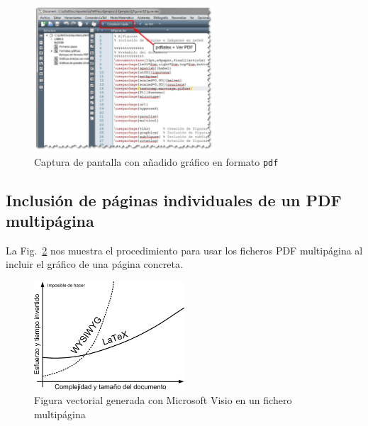 \documentclass[11pt,a4paper]{article}
\begin{document}
\begin{figure}[H]
	\centering
	\includegraphics[width=0.6\textwidth]{../figs/texmk03} 
	\caption[Captura con gráfico en \texttt{pdf}]{Captura de pantalla con añadido gráfico en formato \texttt{pdf}}
	\label{fig:texmk03}
\end{figure}











\subsection{Inclusión de páginas individuales de un \textsf{PDF} multipágina}
La Fig.~\ref{fig:visio_mp} nos muestra el procedimiento para usar los ficheros \textsf{PDF} multipágina al incluir el gráfico de una página concreta.

\begin{figure}[H]
	\centering
	\includegraphics[page=2,width=0.5\textwidth]{../figs/visio_mp} 
	\caption[Gráfico de Visio multipágina]{Figura vectorial generada con Microsoft Visio en un fichero multipágina}
	\label{fig:visio_mp}
\end{figure}
\end{document}
